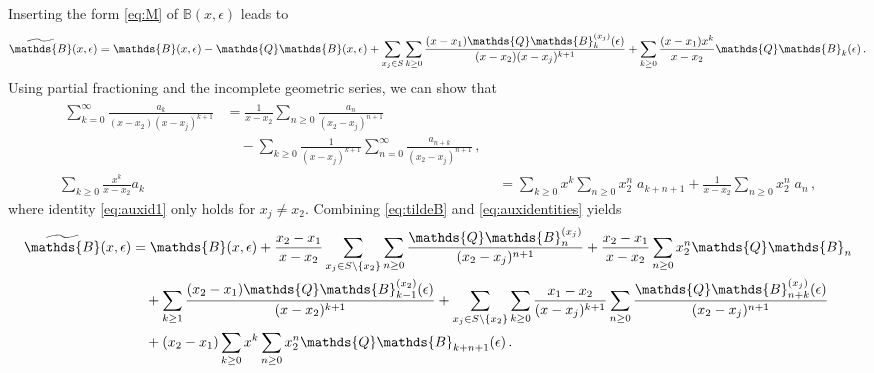 \documentclass[12pt]{article}
\numberwithin{equation}{section}
\numberwithin{figure}{section}
\newcommand{\B}{\mathds{B}}
\newcommand{\Q}{\mathds{Q}}
\begin{document}
     Inserting the form \eqref{eq:M} of $\B(x,\epsilon)$ leads to
      \begin{equation} \label{eq:tildeB}
        \widetilde\B(x,\epsilon)
        =
        \B(x,\epsilon)
        -
        \Q \B(x,\epsilon)
        +
        \sum\limits_{x_j \in S} 
        \sum\limits_{k\geq0} 
        \frac{(x-x_1) \Q \B^{(x_j)}_k(\epsilon)}{(x-x_2)(x-x_j)^{k+1}} 
        + 
        \sum\limits_{k\geq 0} 
        \frac{(x-x_1)x^k}{x-x_2} 
        \Q \B_k(\epsilon)\,.
      \end{equation}
      Using partial fractioning and the incomplete geometric series, we can show that
			\begin{subequations} \label{eq:auxidentities}
				\begin{align}
					\begin{split} \label{eq:auxid1}
						\sum\limits_{k=0}^\infty 
						\frac{a_k}{(x-x_2)(x-x_j)^{k+1}}
						&=
						\frac1{x-x_2} 
						\sum\limits_{n\geq0} 
						\frac{a_n}{(x_2-x_j)^{n+1}} \\ &\quad 
						- 
						\sum\limits_{k\geq0} 
						\frac1{(x-x_j)^{k+1}} 
						\sum\limits_{n=0}^\infty 
						\frac{a_{n+k}}{(x_2-x_j)^{n+1}} \,,
					\end{split} \\
					\sum\limits_{k\geq0} 
					\frac{x^k}{x-x_2} a_k 
					&=
					\sum\limits_{k\geq0} 
					x^k 
					\sum\limits_{n\geq0} 
					x_2^n \;
					a_{k+n+1} 
					+ 
					\frac1{x-x_2} 
					\sum\limits_{n\geq0} 
					x_2^n \; a_n \,,
				\end{align}
			\end{subequations}
      where identity \eqref{eq:auxid1} only holds for $x_j\neq x_2$.
      Combining \eqref{eq:tildeB} and \eqref{eq:auxidentities} yields
      \begin{equation} \label{eq:tildeB2}
				\begin{split}
					\widetilde\B(x,\epsilon)
					&=
					\B(x,\epsilon)
					+
					\frac{x_2-x_1}{x-x_2} 
					\sum\limits_{x_j \in S\backslash\{x_2\}} 
					\sum\limits_{n\geq0} 
					\frac{\Q \B^{(x_j)}_n}{(x_2-x_j)^{n+1}}
					+ 
					\frac{x_2-x_1}{x-x_2} 
					\sum\limits_{n\geq0} 
					x_2^n \Q \B_n \\ &\quad 
					+
					\sum\limits_{k\geq1} 
					\frac{(x_2-x_1) \Q \B^{(x_2)}_{k-1}(\epsilon)}{(x-x_2)^{k+1}}
					+ 
					\sum\limits_{x_j \in S\backslash\{x_2\}} 
					\sum\limits_{k\geq0} 
					\frac{x_1-x_2}{(x-x_j)^{k+1}} 
					\sum\limits_{n\geq0} 
					\frac{\Q \B^{(x_j)}_{n+k}(\epsilon)}{(x_2-x_j)^{n+1}} \\ &\quad
					+
					(x_2-x_1)
					\sum\limits_{k\geq0} 
					x^k 
					\sum\limits_{n\geq0} 
					x_2^n 
					\Q \B_{k+n+1}(\epsilon)\,.
				\end{split}
      \end{equation}
\end{document}
